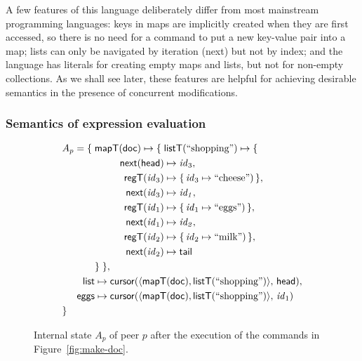\documentclass[a4paper,twocolumn,10pt]{article}
\newcommand{\multialign}[2]{%
  \multispan{#1}\mbox{$\displaystyle{}#2$}%
}
\begin{document}
A few features of this language deliberately differ from most mainstream programming languages: keys in maps are implicitly created when they are first accessed, so there is no need for a command to put a new key-value pair into a map; lists can only be navigated by iteration (\textsf{next}) but not by index; and the language has literals for creating empty maps and lists, but not for non-empty collections. As we shall see later, these features are helpful for achieving desirable semantics in the presence of concurrent modifications.

\subsubsection{Semantics of expression evaluation}

\begin{figure}
\centering \begin{alignat*}{3}
& \multialign{5}{A_p = \{\; \mathsf{mapT}(\mathsf{doc}) \mapsto \{\;
    \mathsf{listT}(\text{``shopping''}) \mapsto \{ } \\
&&&& \mathsf{next}(\mathsf{head}) & \mapsto \mathit{id}_3, \\
&&&& \mathsf{regT}(\mathit{id}_3) & \mapsto \{\,\mathit{id}_3 \mapsto \text{``cheese''})\,\}, \\
&&&& \mathsf{next}(\mathit{id}_3) & \mapsto \mathit{id_1}, \\
&&&& \mathsf{regT}(\mathit{id}_1) & \mapsto \{\,\mathit{id}_1 \mapsto \text{``eggs''})\,\}, \\
&&&& \mathsf{next}(\mathit{id}_1) & \mapsto \mathit{id_2}, \\
&&&& \mathsf{regT}(\mathit{id}_2) & \mapsto \{\,\mathit{id}_2 \mapsto \text{``milk''})\,\}, \\
&&&& \mathsf{next}(\mathit{id}_2) & \mapsto \mathsf{tail} \\
&&& \}\;\}, \\
&& \mathsf{list} & \multialign{3}{\mapsto \mathsf{cursor}(\langle \mathsf{mapT}(\mathsf{doc}),%
    \mathsf{listT}(\text{``shopping''})\rangle,\, \mathsf{head}),} \\
&& \mathsf{eggs} & \multialign{3}{\mapsto \mathsf{cursor}(\langle \mathsf{mapT}(\mathsf{doc}),%
    \mathsf{listT}(\text{``shopping''})\rangle,\, \mathit{id}_1)} \\
& \}
\end{alignat*}
\caption{Internal state $A_p$ of peer $p$ after the execution of the commands in Figure~\ref{fig:make-doc}.}\label{fig:state-example}
\end{figure}
\end{document}
